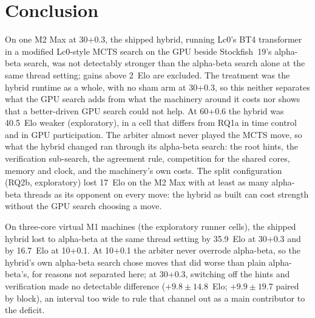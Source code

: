 \documentclass{article}
\begin{document}
\section{Conclusion}
\label{sec:conclusion}
On one M2 Max at 30+0.3, the shipped hybrid, running Lc0's BT4 transformer in a modified Lc0-style MCTS search on the GPU beside Stockfish~19's alpha-beta search, was not detectably stronger than the alpha-beta search alone at the same thread setting; gains above 2~Elo are excluded. The treatment was the hybrid runtime as a whole, with no sham arm at 30+0.3, so this neither separates what the GPU search adds from what the machinery around it costs nor shows that a better-driven GPU search could not help. At 60+0.6 the hybrid was 40.5~Elo weaker (exploratory), in a cell that differs from RQ1a in time control and in GPU participation. The arbiter almost never played the MCTS move, so what the hybrid changed ran through its alpha-beta search: the root hints, the verification sub-search, the agreement rule, competition for the shared cores, memory and clock, and the machinery's own costs. The split configuration (RQ2b, exploratory) lost 17~Elo on the M2 Max with at least as many alpha-beta threads as its opponent on every move: the hybrid as built can cost strength without the GPU search choosing a move.

On three-core virtual M1 machines (the exploratory runner cells), the shipped hybrid lost to alpha-beta at the same thread setting by 35.9~Elo at 30+0.3 and by 16.7~Elo at 10+0.1. At 10+0.1 the arbiter never overrode alpha-beta, so the hybrid's own alpha-beta search chose moves that did worse than plain alpha-beta's, for reasons not separated here; at 30+0.3, switching off the hints and verification made no detectable difference ($+9.8 \pm 14.8$~Elo; $+9.9 \pm 19.7$ paired by block), an interval too wide to rule that channel out as a main contributor to the deficit.
\end{document}

